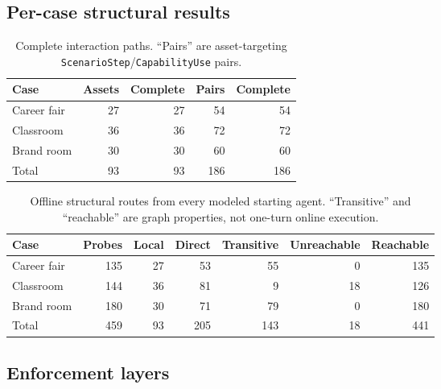 \subsection{Per-case structural results}

\begin{table}[h]
  \caption{Complete interaction paths. ``Pairs'' are asset-targeting
  \texttt{ScenarioStep}/\texttt{CapabilityUse} pairs.}
  \label{tab:per-case-chains}
  \small
  \begin{tabular}{@{}lrrrr@{}}
    \toprule
    Case & Assets & Complete & Pairs & Complete \\
    \midrule
    Career fair & 27 & 27 & 54 & 54 \\
    Classroom & 36 & 36 & 72 & 72 \\
    Brand room & 30 & 30 & 60 & 60 \\
    \midrule
    Total & 93 & 93 & 186 & 186 \\
    \bottomrule
  \end{tabular}
\end{table}

\begin{table}[h]
  \caption{Offline structural routes from every modeled starting agent.
  ``Transitive'' and ``reachable'' are graph properties, not one-turn online
  execution.}
  \label{tab:per-case-routing}
  \small
  \begin{tabular}{@{}lrrrrrr@{}}
    \toprule
    Case & Probes & Local & Direct & Transitive & Unreachable & Reachable \\
    \midrule
    Career fair & 135 & 27 & 53 & 55 & 0 & 135 \\
    Classroom & 144 & 36 & 81 & 9 & 18 & 126 \\
    Brand room & 180 & 30 & 71 & 79 & 0 & 180 \\
    \midrule
    Total & 459 & 93 & 205 & 143 & 18 & 441 \\
    \bottomrule
  \end{tabular}
\end{table}

\subsection{Enforcement layers}

